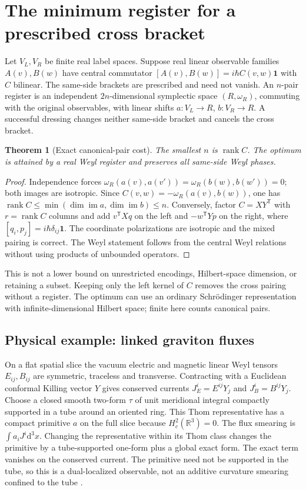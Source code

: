 \documentclass[11pt]{article}
\newtheorem{theorem}{Theorem}[section]
\newcommand{\RR}{\mathbb R}
\newcommand{\dd}{\mathrm d}
\newcommand{\rk}{\operatorname{rank}}
\begin{document}
\section{The minimum register for a prescribed cross bracket}
Let \(V_L,V_R\) be finite real label spaces. Suppose real linear observable families \(A(v),B(w)\) have central commutator \([A(v),B(w)]=i\hbar C(v,w)\mathbf1\) with \(C\) bilinear. The same-side brackets are prescribed and need not vanish. An \(n\)-pair register is an independent \(2n\)-dimensional symplectic space \((R,\omega_R)\), commuting with the original observables, with linear shifts \(a\colon V_L\to R\), \(b\colon V_R\to R\). A successful dressing changes neither same-side bracket and cancels the cross bracket.

\begin{theorem}[Exact canonical-pair cost]\label{thm:rank}
The smallest \(n\) is \(\rk C\). The optimum is attained by a real Weyl register and preserves all same-side Weyl phases.
\end{theorem}
\begin{proof}
Independence forces \(\omega_R(a(v),a(v'))=\omega_R(b(w),b(w'))=0\); both images are isotropic. Since \(C(v,w)=-\omega_R(a(v),b(w))\), one has \(\rk C\leq\min(\dim\operatorname{im}a,\dim\operatorname{im}b)\leq n\). Conversely, factor \(C=XY^{\mathsf T}\) with \(r=\rk C\) columns and add \(v^{\mathsf T}Xq\) on the left and \(-w^{\mathsf T}Yp\) on the right, where \([q_i,p_j]=i\hbar\delta_{ij}\mathbf1\). The coordinate polarizations are isotropic and the mixed pairing is correct. The Weyl statement follows from the central Weyl relations without using products of unbounded operators.
\end{proof}

This is not a lower bound on unrestricted encodings, Hilbert-space dimension, or retaining a subset. Keeping only the left kernel of \(C\) removes the cross pairing without a register. The optimum can use an ordinary Schr\"odinger representation with infinite-dimensional Hilbert space; finite here counts canonical pairs.

\subsection{Physical example: linked graviton fluxes}
On a flat spatial slice the vacuum electric and magnetic linear Weyl tensors \(E_{ij},B_{ij}\) are symmetric, traceless and transverse. Contracting with a Euclidean conformal Killing vector \(Y\) gives conserved currents \(J^i_E=E^{ij}Y_j\) and \(J^i_B=B^{ij}Y_j\). Choose a closed smooth two-form \(\tau\) of unit meridional integral compactly supported in a tube around an oriented ring. This Thom representative has a compact primitive \(a\) on the full slice because \(H^2_c(\RR^3)=0\). The flux smearing is \(\int a_iJ^i\dd^3x\). Changing the representative within its Thom class changes the primitive by a tube-supported one-form plus a global exact form. The exact term vanishes on the conserved current. The primitive need not be supported in the tube, so this is a dual-localized observable, not an additive curvature smearing confined to the tube \cite[Sec.~3]{BCM}.
\end{document}
